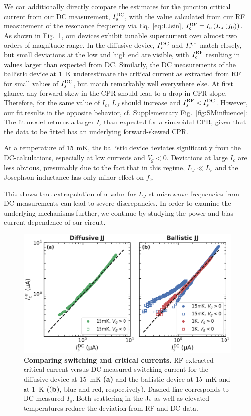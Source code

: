 We can additionally directly compare the estimates for the junction critical current from our DC measurement, $I_s^{\rm DC}$, with the value calculated from our RF measurement of the resonance frequency via Eq.~\ref{eq:LJsin}, $I_c^{\rm RF}=I_c\left(L_J\left(f_0\right)\right)$. 
%
As shown in Fig.~\ref{fig:figure3}, our devices exhibit tunable supercurrent over almost two orders of magnitude range.
%
In the diffusive device, $I_s^{\rm DC}$ and $I_c^{\rm RF}$ match closely, but small deviations at the low and high end are visible, with $I_c^{\rm RF}$ resulting in values larger than expected from DC.
%
Similarly, the DC measurements of the ballistic device at \SI{1}{\kelvin} underestimate the critical current as extracted from RF for small values of $I_s^{\rm DC}$, but match remarkably well everywhere else.
%
At first glance, any forward skew in the CPR should lead to a drop in CPR slope.
%
Therefore, for the same value of $I_c$, $L_J$ should increase and $I_s^{\rm RF}<I_s^{\rm DC}$.
%
However, our fit results in the opposite behavior, cf. Supplementary Fig.~\ref{fig:SMinfluence}:
%
The fit model returns a larger $I_c$ than expected for a sinusoidal CPR, given that the data to be fitted has an underlying forward-skewed CPR.

At a temperature of \SI{15}{\milli\kelvin}, the ballistic device deviates significantly from the DC-calculations, especially at low currents and $V_g<0$.
%
Deviations at large $I_c$ are less obvious, presumably due to the fact that in this regime, $L_J \ll L_r$ and the Josephson inductance has only minor effect on $f_0$.

This shows that extrapolation of a value for $L_J$ at microwave frequencies from DC measurements can lead to severe discrepancies.
%
In order to examine the underlying mechanisms further, we continue by studying the power and bias current dependence of our circuit.

\begin{figure}
	\centering
	\includegraphics[width=0.583\linewidth]{chapter-gJJ-CPR/figs/Figure3}
	\caption{
		\textbf{Comparing switching and critical currents.}
		RF-extracted critical current versus DC-measured switching current for the diffusive device at \SI{15}{\milli\kelvin} \textbf{(a)} and the ballistic device at \SI{15}{\milli\kelvin} and at \SI{1}{\kelvin} (\textbf{(b)}, blue and red, respectively).
		Dashed line corresponds to DC-measured $I_s$.
		Both scattering in the JJ as well as elevated temperatures reduce the deviation from RF and DC data.
	}
	\label{fig:figure3}
\end{figure}

